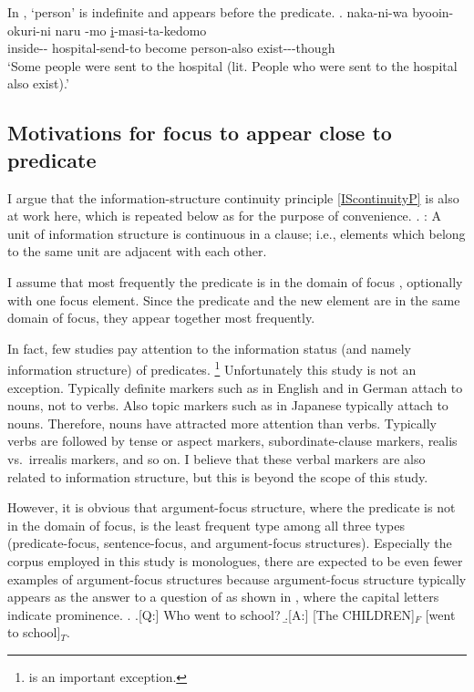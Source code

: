 In \Next,
 `person' is indefinite and appears before the predicate.
\exg. naka-ni-wa byooin-okuri-ni naru -mo \ul{i}-masi-ta-kedomo \\
		inside-- hospital-send-to become person-also exist---though \\
		`Some people were sent to the hospital (lit. People who were sent to the hospital also exist).'


\subsection{Motivations for focus to appear close to predicate}\label{WO:PreP:Motivation}

I argue that the information-structure continuity principle \ref{IScontinuityP} is also at work here, which is repeated below as \Next for the purpose of convenience.
%
\ex. \label{IScontinuityP2}:
 A unit of information structure is continuous in a clause;
 i.e., elements which belong to the same unit are adjacent with each other.

I assume that
most frequently the predicate is in the domain of focus \cite{lambrecht94},
optionally with one focus element.
Since the predicate and the new element are in the same domain of focus,
they appear together most frequently.

In fact, few studies pay attention to the information status (and namely information structure) of predicates.%
	\footnote{
	 is an important exception.
	}
Unfortunately this study is not an exception.
Typically definite markers such as  in English and  in German attach to nouns, not to verbs.
Also topic markers such as  in Japanese typically attach to nouns.
Therefore, nouns have attracted more attention than verbs.
Typically verbs are followed by tense or aspect markers, subordinate-clause markers, realis vs.\ irrealis markers, and so on.
I believe that these verbal markers are also related to information structure,
but this is beyond the scope of this study.

However,
it is obvious that argument-focus structure,
where the predicate is not in the domain of focus,
is the least frequent type among all three types (predicate-focus, sentence-focus, and argument-focus structures).
Especially the corpus employed in this study is monologues,
there are expected to be even fewer examples of argument-focus structures
because argument-focus structure typically appears as the answer to a question of  as shown in \Next,
where the capital letters indicate prominence.
%
\ex.
 \a.[Q:] Who went to school?
 \b.[A:] [The CHILDREN]$_{F}$ [went to school]$_{T}$.
 \hfill{\cite[][p.~121]{lambrecht94}}

